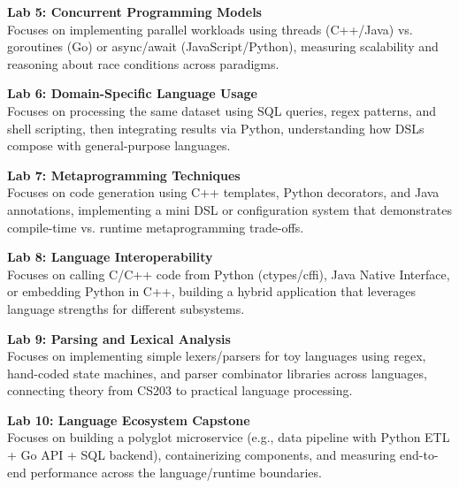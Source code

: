 \vspace{0.2cm}

\noindent\textbf{Lab 5: Concurrent Programming Models} \\
Focuses on implementing parallel workloads using threads (C++/Java) vs. goroutines (Go) or async/await (JavaScript/Python), measuring scalability and reasoning about race conditions across paradigms. \\

\vspace{0.2cm}

\noindent\textbf{Lab 6: Domain-Specific Language Usage} \\
Focuses on processing the same dataset using SQL queries, regex patterns, and shell scripting, then integrating results via Python, understanding how DSLs compose with general-purpose languages. \\

\vspace{0.2cm}

\noindent\textbf{Lab 7: Metaprogramming Techniques} \\
Focuses on code generation using C++ templates, Python decorators, and Java annotations, implementing a mini DSL or configuration system that demonstrates compile-time vs. runtime metaprogramming trade-offs. \\

\vspace{0.2cm}

\noindent\textbf{Lab 8: Language Interoperability} \\
Focuses on calling C/C++ code from Python (ctypes/cffi), Java Native Interface, or embedding Python in C++, building a hybrid application that leverages language strengths for different subsystems. \\

\vspace{0.2cm}

\noindent\textbf{Lab 9: Parsing and Lexical Analysis} \\
Focuses on implementing simple lexers/parsers for toy languages using regex, hand-coded state machines, and parser combinator libraries across languages, connecting theory from CS203 to practical language processing. \\

\vspace{0.2cm}

\noindent\textbf{Lab 10: Language Ecosystem Capstone} \\
Focuses on building a polyglot microservice (e.g., data pipeline with Python ETL + Go API + SQL backend), containerizing components, and measuring end-to-end performance across the language/runtime boundaries.

\vspace{0.2cm}

\newpage
{}
